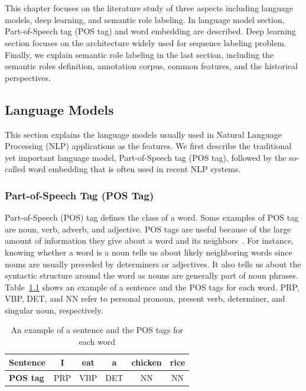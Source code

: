 \chapter{\babDua}
This chapter focuses on the literature study of three aspects including language models, deep learning, and semantic role labeling. In language model section, Part-of-Speech tag (POS tag) and word embedding are described. Deep learning section focuses on the architecture widely used for sequence labeling problem. Finally, we explain semantic role labeling in the last section, including the semantic roles definition, annotation corpus, common features, and the historical perspectives.
\section{Language Models}
This section explains the language models usually used in Natural Language Processing (NLP) applications as the features. We first describe the traditional yet important language model, Part-of-Speech tag (POS tag), followed by the so-called word embedding that is often used in recent NLP systems.

\subsection{Part-of-Speech Tag (POS Tag)}
Part-of-Speech (POS) tag defines the class of a word. Some examples of POS tag are noun, verb, adverb, and adjective. POS tags are useful because of the large amount of information they give about a word and its neighbors~\citep{jurafsky2016speech}. For instance, knowing whether a word is a noun tells us about likely neighboring words since nouns are usually preceded by determiners or adjectives. It also tells us about the syntactic structure around the word as nouns are generally part of noun phrases. Table~\ref{tab:examplepostheory} shows an example of a sentence and the POS tags for each word. PRP, VBP, DET, and NN refer to personal pronoun, present verb, determiner, and singular noun, respectively.

\begin{table}
	\centering
	\caption{An example of a sentence and the POS tags for each word}
	\label{tab:examplepostheory}
	\begin{tabular}{|lccccc|}
		\hline
		\textbf{Sentence} 				& I & eat & a &chicken & rice \\
		\hline
		\textbf{POS tag}		& PRP & VBP & DET & NN & NN \\
		\hline
	\end{tabular}
\end{table}

